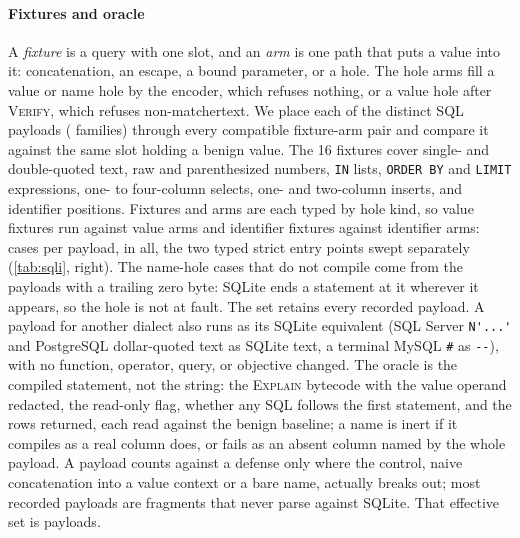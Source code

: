 \paragraph{Fixtures and oracle}
A \emph{fixture} is a query with one slot, and an \emph{arm} is one path that
puts a value into it: concatenation, an escape, a bound parameter, or a hole.
The hole arms fill a value or name hole by the encoder, which refuses nothing,
or a value hole after \textsc{Verify}, which refuses non-matchertext.
We place each of the \dataSqliPayloads distinct SQL payloads (\dataSqliFamilies
families) through every compatible fixture-arm pair and compare it against the same
slot holding a benign value.
The 16 fixtures cover single- and double-quoted text, raw and parenthesized
numbers, \texttt{IN} lists, \texttt{ORDER BY} and \texttt{LIMIT} expressions,
one- to four-column selects, one- and two-column inserts, and identifier
positions.
Fixtures and arms are each typed by hole kind, so \dataSqliValueHosts value
fixtures run against \dataSqliValueArms value arms and \dataSqliIdentHosts
identifier fixtures against \dataSqliIdentArms identifier arms:
\dataSqliCasesPerPayload cases per payload, \dataSqliCases in all, the two typed
strict entry points swept separately (\cref{tab:sqli}, right).
The \dataSqliIdentMtMalformed name-hole cases that do not compile come from the
\dataSqliNulPayloads payloads with a trailing zero byte: SQLite ends a statement
at it wherever it appears, so the hole is not at fault. The set
retains every recorded payload.
A payload for another dialect also runs as its SQLite equivalent (SQL Server
\verb|N'...'| and PostgreSQL dollar-quoted text as SQLite text, a terminal MySQL
\verb|#| as \verb|--|), with no function, operator, query, or objective changed.
The oracle is the compiled statement, not the string: the \textsc{Explain}
bytecode with the value operand redacted, the read-only flag, whether any SQL
follows the first statement, and the rows returned, each read against the benign
baseline; a name is inert if it compiles as a real column does, or fails as an
absent column named by the whole payload. A payload counts against a defense only where the control, naive
concatenation into a value context or a bare name, actually breaks out; most
recorded payloads are fragments that never parse against SQLite. That effective set
is \dataSqliEffective payloads.

\begin{table}[t]
\centering
\caption{Executed outcome by delivery path over the \dataSqliPayloads SQL
payloads (\dataSqliCases cases), the additive default beside the opt-in strict
build. Matcher-delimited holes (lower block) contain every payload; the
concatenation controls (upper block) are the paths that break out.  counts fragments that do not parse against SQLite; ,
statements rejected before the parser.}
\label{tab:sqli}
\small

\end{table}

